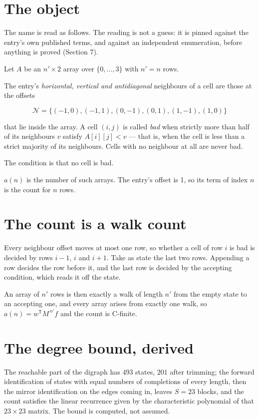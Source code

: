 \documentclass[11pt]{article}
\theoremstyle{definition}
\begin{document}
\section{The object}

The name is read as follows. The reading is not a guess: it is pinned against the entry's own published terms, and against an independent enumeration, before anything is proved (Section 7).

Let $A$ be an $n' \times 2$ array over $\{0,\dots,3\}$ with $n' = n$ rows.

The entry's {\itshape horizontal, vertical and antidiagonal} neighbours of a cell are those at the offsets

\[\mathcal{N} = \{(-1,0), (-1,1), (0,-1), (0,1), (1,-1), (1,0)\}\]

that lie inside the array. A cell $(i,j)$ is called {\itshape bad} when strictly more than half of its neighbours $v$ satisfy $A[i][j] < v$ --- that is, when the cell is less than a strict majority of its neighbours. Cells with no neighbour at all are never bad.

The condition is that no cell is bad.

$a(n)$ is the number of such arrays. The entry's offset is 1, so its term of index $n$ is the count for $n$ rows.

\section{The count is a walk count}

Every neighbour offset moves at most one row, so whether a cell of row $i$ is bad is decided by rows $i-1$, $i$ and $i+1$. Take as state the last two rows. Appending a row decides the row before it, and the last row is decided by the accepting condition, which reads it off the state.

An array of $n'$ rows is then exactly a walk of length $n'$ from the empty state to an accepting one, and every array arises from exactly one walk, so $a(n) = w^{\mathsf T}M^{\,n'}f$ and the count is C-finite.

\section{The degree bound, derived}

The reachable part of the digraph has $493$ states, $201$ after trimming; the forward identification of states with equal numbers of completions of every length, then the mirror identification on the edges coming in, leaves $S = 23$ blocks, and the count satisfies the linear recurrence given by the characteristic polynomial of that $23\times23$ matrix. The bound is computed, not assumed.
\end{document}
